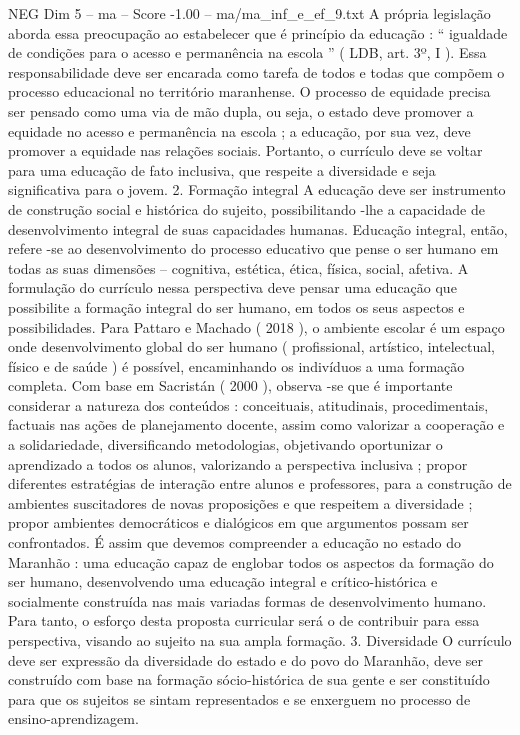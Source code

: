 \begin{textsample}{NEG Dim 5 – ma – Score -1.00 – ma/ma\_inf\_e\_ef\_9.txt}
A própria legislação aborda essa preocupação ao estabelecer que é princípio da educação : “ igualdade de condições para o acesso e permanência na escola ” ( LDB, art. 3º, I ).
Essa responsabilidade deve ser encarada como tarefa de todos e todas que compõem o processo educacional no território maranhense.
O processo de equidade precisa ser pensado como uma via de mão dupla, ou seja, o estado deve promover a equidade no acesso e permanência na escola ; a educação, por sua vez, deve promover a equidade nas relações sociais.
Portanto, o currículo deve se voltar para uma educação de fato inclusiva, que respeite a diversidade e seja significativa para o jovem. 2.
Formação integral A educação deve ser instrumento de construção social e histórica do sujeito, possibilitando -lhe a capacidade de desenvolvimento integral de suas capacidades humanas.
Educação integral, então, refere -se ao desenvolvimento do processo educativo que pense o ser humano em todas as suas dimensões – cognitiva, estética, ética, física, social, afetiva.
A formulação do currículo nessa perspectiva deve pensar uma educação que possibilite a formação integral do ser humano, em todos os seus aspectos e possibilidades.
Para Pattaro e Machado ( 2018 ), o ambiente escolar é um espaço onde desenvolvimento global do ser humano ( profissional, artístico, intelectual, físico e de saúde ) é possível, encaminhando os indivíduos a uma formação completa.
Com base em Sacristán ( 2000 ), observa -se que é importante considerar a natureza dos conteúdos : conceituais, atitudinais, procedimentais, factuais nas ações de planejamento docente, assim como valorizar a cooperação e a solidariedade, diversificando metodologias, objetivando oportunizar o aprendizado a todos os alunos, valorizando a perspectiva inclusiva ; propor diferentes estratégias de interação entre alunos e professores, para a construção de ambientes suscitadores de novas proposições e que respeitem a diversidade ; propor ambientes democráticos e dialógicos em que argumentos possam ser confrontados.
É assim que devemos compreender a educação no estado do Maranhão : uma educação capaz de englobar todos os aspectos da formação do ser humano, desenvolvendo uma educação integral e crítico-histórica e socialmente construída nas mais variadas formas de desenvolvimento humano.
Para tanto, o esforço desta proposta curricular será o de contribuir para essa perspectiva, visando ao sujeito na sua ampla formação. 3.
Diversidade O currículo deve ser expressão da diversidade do estado e do povo do Maranhão, deve ser construído com base na formação sócio-histórica de sua gente e ser constituído para que os sujeitos se sintam representados e se enxerguem no processo de ensino-aprendizagem.

\end{textsample}
